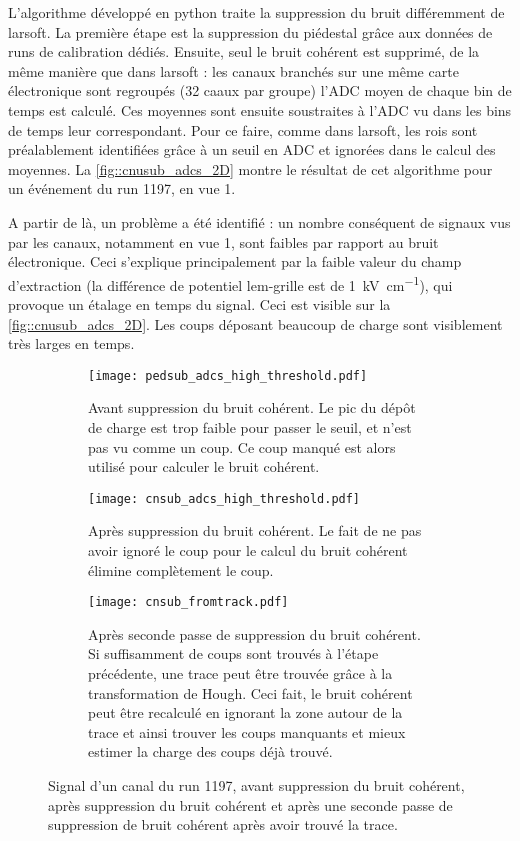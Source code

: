       L'algorithme développé en python traite la suppression du bruit différemment de \gls{larsoft}. La première étape est la suppression du piédestal grâce aux données de runs de calibration dédiés. Ensuite, seul le bruit cohérent est supprimé, de la même manière que dans \gls{larsoft} : les canaux branchés sur une même carte électronique sont regroupés (32 caaux par groupe) l'ADC moyen de chaque bin de temps est calculé. Ces moyennes sont ensuite soustraites à l'ADC vu dans les bins de temps leur correspondant. Pour ce faire, comme dans \gls{larsoft}, les \glspl{roi} sont préalablement identifiées grâce à un seuil en ADC et ignorées dans le calcul des moyennes. La \autoref{fig::cnusub_adcs_2D} montre le résultat de cet algorithme pour un événement du run 1197, en vue 1.

      A partir de là, un problème a été identifié : un nombre conséquent de signaux vus par les canaux, notamment en vue 1, sont faibles par rapport au bruit électronique. Ceci s'explique principalement par la faible valeur du champ d'extraction (la différence de potentiel \gls{lem}-grille est de \SI{1}{\kilo\volt\per\centi\meter}), qui provoque un étalage en temps du signal. Ceci est visible sur la \autoref{fig::cnusub_adcs_2D}. Les coups déposant beaucoup de charge sont visiblement très larges en temps.

      \begin{figure}[htbp]
        \centering
        \begin{subfigure}[t]{0.9\textwidth}
          \centering
          \texttt{[image: pedsub\_adcs\_high\_threshold.pdf]}
          \caption[]{Avant suppression du bruit cohérent. Le pic du dépôt de charge est trop faible pour passer le seuil, et n'est pas vu comme un coup. Ce coup manqué est alors utilisé pour calculer le bruit cohérent.}
        \end{subfigure}\hfill
        \begin{subfigure}[t]{0.9\textwidth}
          \centering
          \texttt{[image: cnsub\_adcs\_high\_threshold.pdf]}
          \caption[]{Après suppression du bruit cohérent. Le fait de ne pas avoir ignoré le coup pour le calcul du bruit cohérent élimine complètement le coup.}
        \end{subfigure}
        \begin{subfigure}[t]{0.9\textwidth}
          \centering
          \texttt{[image: cnsub\_fromtrack.pdf]}
          \caption[]{Après seconde passe de suppression du bruit cohérent. Si suffisamment de coups sont trouvés à l'étape précédente, une trace peut être trouvée grâce à la transformation de Hough. Ceci fait, le bruit cohérent peut être recalculé en ignorant la zone autour de la trace et ainsi trouver les coups manquants et mieux estimer la charge des coups déjà trouvé.}
        \end{subfigure}
        \caption[Supression du bruit cohérent.]{\label{fig::strip_before_after_cnsub}Signal d'un canal du run 1197, avant suppression du bruit cohérent, après suppression du bruit cohérent et après une seconde passe de suppression de bruit cohérent après avoir trouvé la trace.}
      \end{figure}

